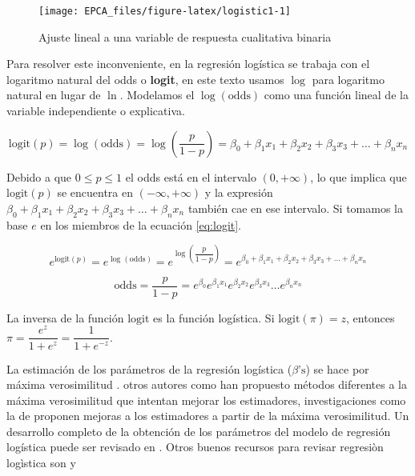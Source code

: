 \documentclass[
]{krantz}
\begin{document}
\begin{figure}[!h]

{\centering \texttt{[image: EPCA\_files/figure-latex/logistic1-1]} 

}

\caption{Ajuste lineal a una variable de respuesta cualitativa binaria}\label{fig:logistic1}
\end{figure}

Para resolver este inconveniente, en la regresión logística se trabaja con el logaritmo natural del odds o \textbf{logit}, en este texto usamos \(\log\) para logaritmo natural en lugar de \(\ln\). Modelamos el \(\log\left(\text{odds}\right)\) como una función lineal de la variable independiente o explicativa.

\begin{equation}
\text{logit}\left(p\right) = \log \left(\text{odds}\right) =  \log \left( \dfrac{p}{1-p}\right) = \beta_0 + \beta_1 x_1 + \beta_2 x_2 + \beta_3 x_3 + \ldots + \beta_n x_n
    \label{eq:logit}
\end{equation}

Debido a que \(0 \leq p \leq 1\) el odds está en el intervalo \(\left( 0, + \infty \right)\), lo que implica que \(\text{logit}\left(p\right)\) se encuentra en \(\left( -\infty , + \infty \right)\) y la expresión \(\beta_0 + \beta_1 x_1 + \beta_2 x_2 + \beta_3 x_3 + \ldots + \beta_n x_n\) también cae en ese intervalo. Si tomamos la base \(e\) en los miembros de la ecuación \eqref{eq:logit}.

\begin{equation}
  e^{\text{logit}\left(p\right)} = e^{\log \left(\text{odds}\right)} =  e^{\log \left( \dfrac{p}{1-p}\right)} = e^{\beta_0 + \beta_1 x_1 + \beta_2 x_2 + \beta_3 x_3 + \ldots + \beta_n x_n }
    \label{eq:logit2}
\end{equation}

\begin{equation}
   \text{odds} =  \dfrac{p}{1-p} = e^{\beta_0}e^{\beta_1 x_1}e^{\beta_2 x_2}e^{ \beta_3 x_3}\ldots e^{\beta_n x_n}
    \label{eq:logit3}
\end{equation}

La inversa de la función \(\text{logit}\) es la función logística. Si \(\text{logit}\left(\pi\right)=z\), entonces \(\pi = \dfrac{e^z}{1+e^z} = \dfrac{1}{1+e^{-z}}\).

La estimación de los parámetros de la regresión logística (\(\beta\text{'s}\)) se hace por máxima verosimilitud \citep{albert1984}. otros autores como \citet{lecessie92} han propuesto métodos diferentes a la máxima verosimilitud que intentan mejorar los estimadores, investigaciones como la de \citet{breslow97} proponen mejoras a los estimadores a partir de la máxima verosimilitud. Un desarrollo completo de la obtención de los parámetros del modelo de regresión logística puede ser revisado en \citet{hosmer2013}. Otros buenos recursos para revisar regresiòn logìstica son \citet{hibe2017} y \citet{hibe2015}
\end{document}
